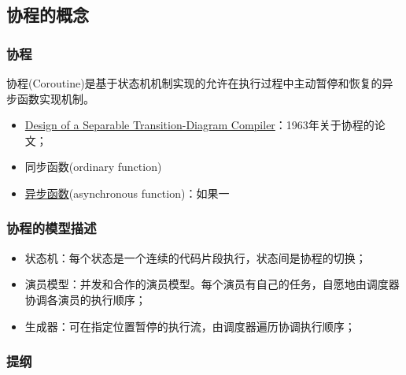 \subsection{协程的概念}
% 
\begin{frame}[fragile]
    \frametitle{协程}
% 
协程(Coroutine)是基于状态机机制实现的允许在执行过程中主动暂停和恢复的异步函数实现机制。

    \begin{itemize}
        \item \href{http://melconway.com/Home/pdf/compiler.pdf}{Design of a Separable Transition-Diagram Compiler}：1963年关于协程的论文；
        \item 同步函数(ordinary function)%
        \item \href{https://www.cnblogs.com/balingybj/p/4780442.html}{异步函数}(asynchronous function)：如果一%
    \end{itemize}

% 

\end{frame}
\begin{frame}[fragile]
    \frametitle{协程的模型描述}

    \begin{itemize}
        \item 状态机：每个状态是一个连续的代码片段执行，状态间是协程的切换；
        \item 演员模型：并发和合作的演员模型。每个演员有自己的任务，自愿地由调度器协调各演员的执行顺序；
        \item 生成器：可在指定位置暂停的执行流，由调度器遍历协调执行顺序；
    \end{itemize}
\end{frame}
% 
\begin{frame}
\frametitle{提纲} %
\tableofcontents %
\end{frame}
